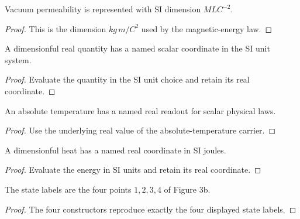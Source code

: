 \begin{definition}
  \label{def:physics:IPhO_2026_3_C_1:aux003}
  Vacuum permeability is represented with SI dimension
  \(M L C^{-2}\).
\end{definition}
\begin{proof}
  This is the dimension \(kg\,m/C^2\) used by the magnetic-energy law.
\end{proof}

\begin{definition}[SI coordinate]
  \label{def:physics:IPhO_2026_3_C_1:aux004}
  A dimensionful real quantity has a named scalar coordinate in the SI unit
  system.
\end{definition}
\begin{proof}
  Evaluate the quantity in the SI unit choice and retain its real coordinate.
\end{proof}

\begin{definition}
  \label{def:physics:IPhO_2026_3_C_1:aux005}
  An absolute temperature has a named real readout for scalar physical laws.
\end{definition}
\begin{proof}
  Use the underlying real value of the absolute-temperature carrier.
\end{proof}

\begin{definition}
  \label{def:physics:IPhO_2026_3_C_1:aux006}
  A dimensionful heat has a named real coordinate in SI joules.
\end{definition}
\begin{proof}
  Evaluate the energy in SI units and retain its real coordinate.
\end{proof}

\begin{definition}
  \label{def:physics:IPhO_2026_3_C_1:aux007}
  The state labels are the four points \(1,2,3,4\) of Figure 3b.
\end{definition}
\begin{proof}
  The four constructors reproduce exactly the four displayed state labels.
\end{proof}

